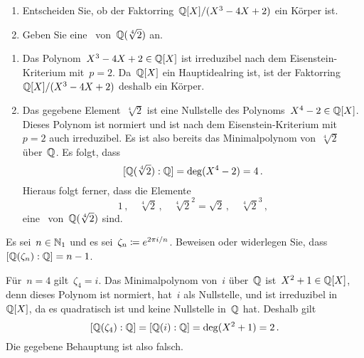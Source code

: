 \documentclass{scrartcl}
\begin{document}
\begin{exercise}[subtitle = {Erstklausur~19/20}]
  \begin{enumerate}
    \item
      Entscheiden Sie, ob der Faktorring~$\mathbb{Q}[X] / (X^3 - 4X + 2)$ ein Körper ist.
    \item
      Geben Sie eine~\Basis{$\Rational$} von~$\mathbb{Q}(\sqrt[4]{2})$ an.
  \end{enumerate}
\end{exercise}

\begin{solution}
  \begin{enumerate}
    \item
      Das Polynom~$X^3 - 4X + 2 \in \mathbb{Q}[X]$ ist irreduzibel nach dem Eisenstein-Kriterium mit~$p = 2$.
      Da~$\mathbb{Q}[X]$ ein Hauptidealring ist, ist der Faktorring~$\mathbb{Q}[X] / (X^3 - 4X + 2)$ deshalb ein Körper.
    \item
      Das gegebene Element~$\sqrt[4]{2}$ ist eine Nullstelle des Polynoms~$X^4 - 2 \in \mathbb{Q}[X]$.
      Dieses Polynom ist normiert und ist nach dem Eisenstein-Kriterium mit~$p = 2$ auch irreduzibel.
      Es ist also bereits das Minimalpolynom von~$\sqrt[4]{2}$ über~$\Rational$.
      Es folgt, dass
      \[
        [\mathbb{Q}(\sqrt[4]{2}) : \mathbb{Q}]
        =
        \deg(X^4 - 2)
        =
        4 \,.
      \]
      Hieraus folgt ferner, dass die Elemente
      \[
        1 \,,
        \quad
        \sqrt[4]{2} \,,
        \quad
        \sqrt[4]{2}^2 = \sqrt{2} \,,
        \quad
        \sqrt[4]{2}^3 \,,
      \]
      eine~\Basis{$\Rational$} von~$\mathbb{Q}(\sqrt[4]{2})$ sind.
  \end{enumerate}
\end{solution}


\begin{exercise}[subtitle = {Erstklausur~18/19, Zweitklausur~18/19}]
  Es sei~$n \in \mathbb{N}_1$ und es sei~$\zeta_n \coloneqq e^{2 \pi i / n}$.
  Beweisen oder widerlegen Sie, dass~$[\mathbb{Q}(\zeta_n) : \mathbb{Q}] = n-1$.
\end{exercise}

\begin{solution}
  Für~$n = 4$ gilt~$\zeta_4 = i$.
  Das Minimalpolynom von~$i$ über~$\Rational$ ist~$X^2 + 1 \in \mathbb{Q}[X]$, denn dieses Polynom ist normiert, hat~$i$ als Nullstelle, und ist irreduzibel in~$\mathbb{Q}[X]$, da es quadratisch ist und keine Nullstelle in~$\Rational$ hat.
  Deshalb gilt
  \[
    [\mathbb{Q}(\zeta_4) : \mathbb{Q}]
    =
    [\mathbb{Q}(i) : \mathbb{Q}]
    =
    \deg(X^2 + 1)
    =
    2 \,.
  \]
  Die gegebene Behauptung ist also falsch.
\end{solution}
\end{document}
